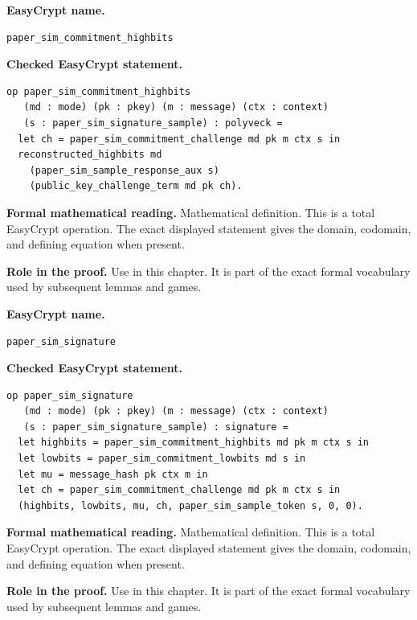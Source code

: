\begin{formaldefinition}
\noindent\textbf{EasyCrypt name.}
\begin{lstlisting}[language=EasyCrypt,basicstyle=\ttfamily\scriptsize]
paper_sim_commitment_highbits
\end{lstlisting}
\noindent\textbf{Checked EasyCrypt statement.}
\begin{lstlisting}[language=EasyCrypt,basicstyle=\ttfamily\scriptsize]
op paper_sim_commitment_highbits
   (md : mode) (pk : pkey) (m : message) (ctx : context)
   (s : paper_sim_signature_sample) : polyveck =
  let ch = paper_sim_commitment_challenge md pk m ctx s in
  reconstructed_highbits md
    (paper_sim_sample_response_aux s)
    (public_key_challenge_term md pk ch).
\end{lstlisting}
\noindent\textbf{Formal mathematical reading.}
Mathematical definition. This is a total EasyCrypt operation.  The exact displayed statement gives the domain, codomain, and defining equation when present.

\noindent\textbf{Role in the proof.}
Use in this chapter. It is part of the exact formal vocabulary used by subsequent lemmas and games.

\end{formaldefinition}

\begin{formaldefinition}
\noindent\textbf{EasyCrypt name.}
\begin{lstlisting}[language=EasyCrypt,basicstyle=\ttfamily\scriptsize]
paper_sim_signature
\end{lstlisting}
\noindent\textbf{Checked EasyCrypt statement.}
\begin{lstlisting}[language=EasyCrypt,basicstyle=\ttfamily\scriptsize]
op paper_sim_signature
   (md : mode) (pk : pkey) (m : message) (ctx : context)
   (s : paper_sim_signature_sample) : signature =
  let highbits = paper_sim_commitment_highbits md pk m ctx s in
  let lowbits = paper_sim_commitment_lowbits md s in
  let mu = message_hash pk ctx m in
  let ch = paper_sim_commitment_challenge md pk m ctx s in
  (highbits, lowbits, mu, ch, paper_sim_sample_token s, 0, 0).
\end{lstlisting}
\noindent\textbf{Formal mathematical reading.}
Mathematical definition. This is a total EasyCrypt operation.  The exact displayed statement gives the domain, codomain, and defining equation when present.

\noindent\textbf{Role in the proof.}
Use in this chapter. It is part of the exact formal vocabulary used by subsequent lemmas and games.

\end{formaldefinition}

